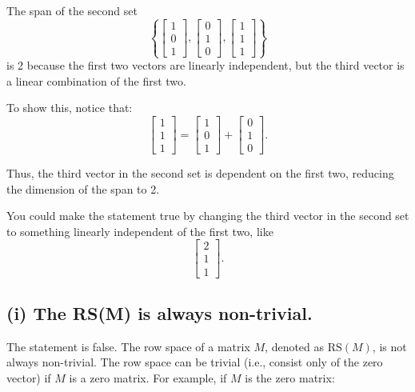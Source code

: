 \documentclass{article}
\begin{document}
The span of the second set 
\[
\left\{ 
\begin{bmatrix} 
1 \\ 0 \\ 1 
\end{bmatrix}, 
\begin{bmatrix} 
0 \\ 1 \\ 0 
\end{bmatrix}, 
\begin{bmatrix} 
1 \\ 1 \\ 1 
\end{bmatrix}
\right\}
\]
is 2 because the first two vectors are linearly independent, but the third vector is a linear combination of the first two.

To show this, notice that:
\[
\begin{bmatrix} 
1 \\ 1 \\ 1 
\end{bmatrix} 
= \begin{bmatrix} 
1 \\ 0 \\ 1 
\end{bmatrix} + \begin{bmatrix} 
0 \\ 1 \\ 0 
\end{bmatrix}.
\]

Thus, the third vector in the second set is dependent on the first two, reducing the dimension of the span to 2.

You could make the statement true by changing the third vector in the second set to something linearly independent of the first two, like 
\[
\begin{bmatrix} 
2 \\ 1 \\ 1 
\end{bmatrix}.
\]

\subsection*{(i) The RS(M) is always non-trivial.}

The statement is false. The row space of a matrix \( M \), denoted as \( \text{RS}(M) \), is not always non-trivial. The row space can be trivial (i.e., consist only of the zero vector) if \( M \) is a zero matrix. For example, if \( M \) is the zero matrix:
\end{document}
